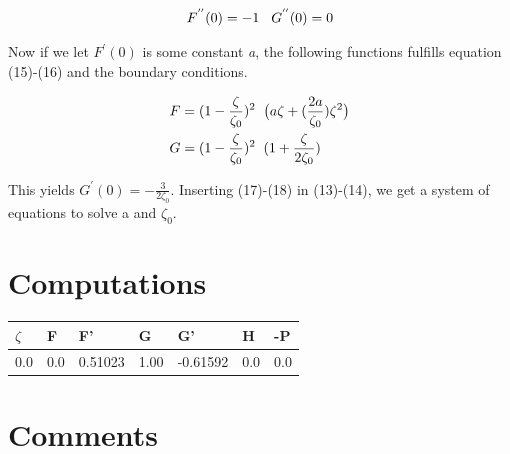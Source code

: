 \documentclass[a4paper,norsk]{article}
\begin{document}
\begin{align}
F^{''}(0) = -1 \hspace{3mm} G^{''}(0) = 0
\end{align}

Now if we let $F^{'}(0)$ is some constant \textit{a}, the following functions fulfills equation (15)-(16) and
the boundary conditions.

\begin{align}
F &= (1 - \frac{\zeta}{\zeta_0})^2 \hspace{2mm} \big(a\zeta + (\frac{2a}{\zeta_0}) \zeta^2 \big) \\
G &= (1 - \frac{\zeta}{\zeta_0} )^2 \hspace{2mm} (1 + \frac{\zeta}{2\zeta_0} )
\end{align}

This yields $G^{'}(0) = -\frac{3}{2 \zeta_0}$. Inserting (17)-(18) in (13)-(14), we get a system of
equations to solve a and $\zeta_0$.

\newpage
\section*{Computations}
\begin{center}
    \begin{tabular}{| l | l | l | l | l | l | p{5cm} |}
    \hline
    $\zeta$ & F & F' & G & G' & H & -P \\ \hline
    0.0 & 0.0 & 0.51023 & 1.00 & -0.61592 & 0.0 & 0.0 \\ \hline
    \hline
    \end{tabular}
\end{center}


\section*{Comments}
\end{document}

